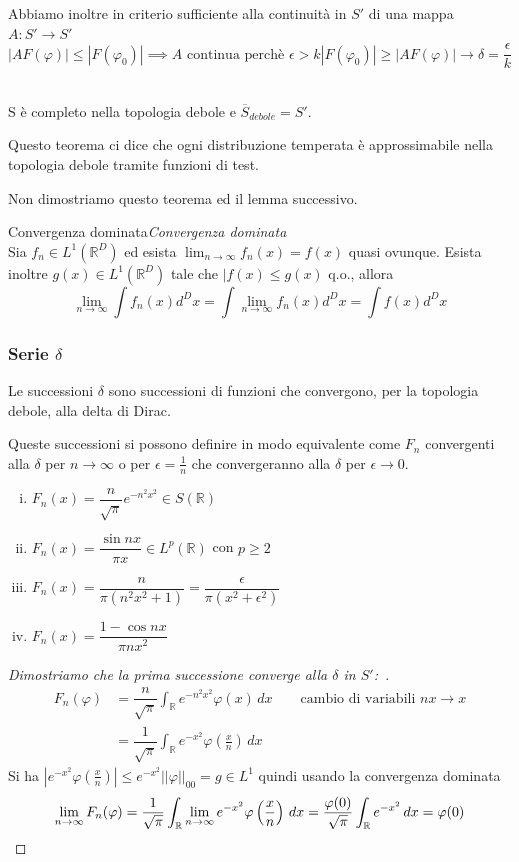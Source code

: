 \documentclass[11pt,a4paper,twoside]{book}
\newenvironment{teorema}[1][\empty]{\begin{Teorema}{
\ifx\empty#1\relax\else\mdseries\itshape#1\\\fi
}{}}{\end{Teorema}}
\newenvironment{lemma}[1][\empty]{\begin{Lemma}{
\ifx\empty#1\relax\else\mdseries\itshape#1\\\fi
}{}}{\end{Lemma}}
\newenvironment{dimo}[1][\proofname]{
	\begin{tcolorbox}[
	breakable, 
	enhanced, 
	interior hidden, 
	frame hidden, 
	borderline west = {1pt}{0pt}{gray}, 
	top=0pt, bottom=0pt, left=0pt]
\begin{proof}[#1:~]
}
{
\end{proof}
\end{tcolorbox}
}
\theoremstyle{esss}
\theoremstyle{dotless}
\numberwithin{equation}{section} %
\begin{document}
Abbiamo inoltre in criterio sufficiente alla continuità in $S'$ di una mappa $A:S'\rightarrow S'$ 
\[
|AF(\varphi)|\leq|F(\varphi_0)|\implies A \text{ continua perchè } \epsilon>k|F(\varphi_0)|\geq|AF(\varphi)|\rightarrow \delta=\dfrac{\epsilon}{k}
\]

\begin{teorema}
S è completo nella topologia debole e $\overline{S}_{debole}=S'$.
\end{teorema}
Questo teorema ci dice che ogni distribuzione temperata è approssimabile nella topologia debole tramite funzioni di test.


Non dimostriamo questo teorema ed il lemma successivo.
\begin{lemma}[Convergenza dominata]
Sia $f_n\in L^1(\mathbb{R}^D)$ ed esista $\lim_{n\rightarrow\infty}f_n(x)=f(x)$ quasi ovunque. Esista inoltre $g(x)\in L^1(\mathbb{R}^D)$ tale che $|f(x)\leq g(x)$ q.o., allora
\[
\lim_{n\rightarrow\infty}\int f_n(x)d^Dx=\int \lim_{n\rightarrow\infty}f_n(x)d^Dx=\int f(x) d^Dx
\]
\end{lemma}

\subsubsection{Serie \boldmath$\delta$}

Le successioni $\delta$ sono successioni di funzioni che convergono, per la topologia debole, alla delta di Dirac.

Queste successioni si possono definire in modo equivalente come $F_n$ convergenti alla $\delta$ per $n\rightarrow\infty$ o per $\epsilon=\frac{1}{n}$ che convergeranno alla $\delta$ per $\epsilon\rightarrow0$.

\begin{enumerate}[i.]
\item $F_n(x)=\dfrac{n}{\sqrt{\pi}}e^{-n^2x^2}\in S(\mathbb{R})$
\item $F_n(x)=\dfrac{\sin{nx}}{\pi x}\in L^p(\mathbb{R})$ con $p\geq2$
\item $F_n(x)=\dfrac{n}{\pi(n^2x^2+1)}=\dfrac{\epsilon}{\pi(x^2+\epsilon^2)}$
\item $F_n(x)=\dfrac{1-\cos{nx}}{\pi nx^2}$
\end{enumerate}

\begin{dimo}[Dimostriamo che la prima successione converge alla $\delta$ in $S'$]
\begin{align*}
F_n(\varphi)&=\dfrac{n}{\sqrt{\pi}}\int_{\mathbb{R}} e^{-n^2x^2}\varphi(x)\,dx \qquad \text{cambio di variabili }nx\rightarrow x \\
&= \dfrac{1}{\sqrt{\pi}} \int_{\mathbb{R}} e^{-x^2} \varphi\left(\frac{x}{n}\right)\, dx
\end{align*}
Si ha $\left|e^{-x^2}\varphi\left(\frac{x}{n}\right)\right|\leq e^{-x^2} ||\varphi||_{00}=g\in L^1$ quindi usando la convergenza dominata
\[
\lim_{n\rightarrow\infty}F_n(\varphi)=\dfrac{1}{\sqrt{\pi}} \int_{\mathbb{R}}\lim_{n\rightarrow\infty} e^{-x^2}\varphi\left(\frac{x}{n}\right)\,dx=\dfrac{\varphi(0)}{\sqrt{\pi}}\int_{\mathbb{R}} e^{-x^2}\,dx=\varphi(0) \qedhere
\] 
\end{dimo}
\end{document}
